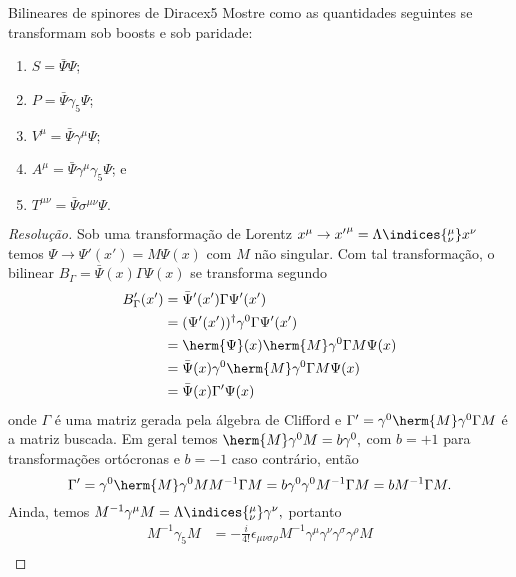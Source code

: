 \begin{exercício}{Bilineares de spinores de Dirac}{ex5}
    Mostre como as quantidades seguintes se transformam sob boosts e sob paridade:
    \begin{enumerate}[label=(\alph*)]
        \item \(S = \bar{\Psi}\Psi\);
        \item \(P = \bar{\Psi}\gamma_5\Psi\);
        \item \(V^\mu = \bar{\Psi}\gamma^\mu \Psi\);
        \item \(A^\mu = \bar{\Psi}\gamma^\mu\gamma_5\Psi\); e
        \item \(T^{\mu\nu} = \bar{\Psi} \sigma^{\mu\nu} \Psi.\)
    \end{enumerate}
\end{exercício}
\begin{proof}[Resolução]
    Sob uma transformação de Lorentz \(x^\mu \to {x'}^\mu = \Lambda\indices{^\mu_\nu} x^\nu\)temos \(\Psi \to \Psi'(x') = M\Psi(x)\) com \(M\) não singular. Com tal transformação, o bilinear \(B_{\Gamma} = \bar{\Psi}(x) \Gamma \Psi(x)\) se transforma segundo
    \begin{align*}
        B_\Gamma'(x') &= \bar{\Psi}'(x') \Gamma\Psi'(x')\\
                      &= (\Psi'(x'))^\dag \gamma^0 \Gamma \Psi'(x')\\
                      &= \herm{\Psi}(x) \herm{M} \gamma^0 \Gamma M \Psi(x)\\
                      &= \bar{\Psi}(x) \gamma^0 \herm{M} \gamma^0 \Gamma M \Psi(x)\\
                      &= \bar{\Psi}(x) \Gamma' \Psi(x)
    \end{align*}
    onde \(\Gamma\) é uma matriz gerada pela álgebra de Clifford e \(\Gamma' = \gamma^0 \herm{M} \gamma^0 \Gamma M\) é a matriz buscada. Em geral temos \(\herm{M} \gamma^0 M = b \gamma^0,\) com \(b = +1\) para transformações ortócronas e \(b = -1\) caso contrário, então
    \begin{equation*}
        \Gamma' = \gamma^0 \herm{M} \gamma^0 M M^{-1} \Gamma M = b \gamma^0 \gamma^0 M^{-1} \Gamma M = b M^{-1} \Gamma M.
    \end{equation*}
    Ainda, temos \(M^{-1} \gamma^\mu M = \Lambda\indices{^\mu_\nu} \gamma^\nu,\) portanto
    \begin{align*}
        M^{-1} \gamma_5 M &= -\frac{i}{4!} \epsilon_{\mu\nu\sigma\rho}M^{-1} \gamma^\mu \gamma^\nu \gamma^\sigma \gamma^\rho M\\

\end{align*}
\end{proof}
